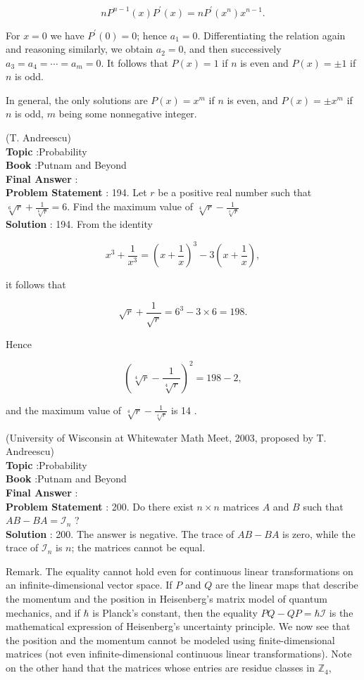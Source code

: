 \documentclass[10pt]{article}
\begin{document}
$$
n P^{n-1}(x) P^{\prime}(x)=n P^{\prime}\left(x^{n}\right) x^{n-1} .
$$

For $x=0$ we have $P^{\prime}(0)=0$; hence $a_{1}=0$. Differentiating the relation again and reasoning similarly, we obtain $a_{2}=0$, and then successively $a_{3}=a_{4}=\cdots=a_{m}=0$. It follows that $P(x)=1$ if $n$ is even and $P(x)=\pm 1$ if $n$ is odd.

In general, the only solutions are $P(x)=x^{m}$ if $n$ is even, and $P(x)=\pm x^{m}$ if $n$ is odd, $m$ being some nonnegative integer.

(T. Andreescu) 
\\
\textbf{Topic} :Probability\\
\textbf{Book} :Putnam and Beyond\\
\textbf{Final Answer} :\\


\textbf{Problem Statement} :
194. Let $r$ be a positive real number such that $\sqrt[6]{r}+\frac{1}{\sqrt[6]{r}}=6$. Find the maximum value of $\sqrt[4]{r}-\frac{1}{\sqrt[4]{r}}$
\\
\textbf{Solution} :
194. From the identity

$$
x^{3}+\frac{1}{x^{3}}=\left(x+\frac{1}{x}\right)^{3}-3\left(x+\frac{1}{x}\right),
$$

it follows that

$$
\sqrt{r}+\frac{1}{\sqrt{r}}=6^{3}-3 \times 6=198 .
$$

Hence

$$
\left(\sqrt[4]{r}-\frac{1}{\sqrt[4]{r}}\right)^{2}=198-2,
$$

and the maximum value of $\sqrt[4]{r}-\frac{1}{\sqrt[4]{r}}$ is 14 .

(University of Wisconsin at Whitewater Math Meet, 2003, proposed by T. Andreescu)
\\
\textbf{Topic} :Probability\\
\textbf{Book} :Putnam and Beyond\\
\textbf{Final Answer} :\\


\textbf{Problem Statement} :
200. Do there exist $n \times n$ matrices $A$ and $B$ such that $A B-B A=\mathcal{I}_{n}$ ?
\\
\textbf{Solution} :
200. The answer is negative. The trace of $A B-B A$ is zero, while the trace of $\mathcal{I}_{n}$ is $n$; the matrices cannot be equal.

Remark. The equality cannot hold even for continuous linear transformations on an infinite-dimensional vector space. If $P$ and $Q$ are the linear maps that describe the momentum and the position in Heisenberg's matrix model of quantum mechanics, and if $\hbar$ is Planck's constant, then the equality $P Q-Q P=\hbar \mathcal{I}$ is the mathematical expression of Heisenberg's uncertainty principle. We now see that the position and the momentum cannot be modeled using finite-dimensional matrices (not even infinite-dimensional continuous linear transformations). Note on the other hand that the matrices whose entries are residue classes in $\mathbb{Z}_{4}$,
\end{document}
